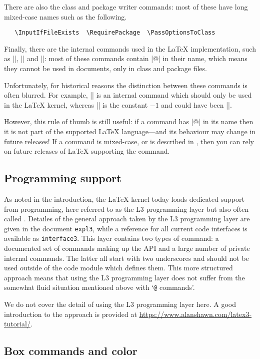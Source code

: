 \documentclass{ltxguide}
\begin{document}
There are also the class and package writer commands:
most of these have long mixed-case names such as the following.
\begin{verbatim}
   \InputIfFileExists  \RequirePackage  \PassOptionsToClass
\end{verbatim}

Finally, there are the internal commands used in the \LaTeX{}
implementation, such as |\@tempcnta|, |\@ifnextchar| and |\@eha|:
most of these commands contain |@| in their name, which means they
cannot be used in documents, only in class and package files.

Unfortunately, for historical reasons the distinction between these
commands is often blurred.  For example, |\hbox| is an internal
command which should only be used in the \LaTeX{} kernel, whereas
|\m@ne| is the constant $-1$ and could have been |\MinusOne|.

However, this rule of thumb is still useful: if a command has |@| in
its name then it is not part of the supported \LaTeX{} language---and
its behaviour may change in future releases!  If a command is
mixed-case, or is described in \emph{\LaTeXbook}, then you can rely on
future releases of \LaTeX{} supporting the command.

\subsection{Programming support}

As noted in the introduction, the \LaTeX{} kernel today loads dedicated support
from programming, here referred to as the L3 programming layer but also often
called . Detailes of the general approach taken by the L3
programming layer are given in the document \texttt{expl3}, while a reference
for all current code interfaces is available as \texttt{interface3}. This layer
contains two types of command: a documented set of commands making up the API
and a large number of private internal commands. The latter all start with two
underscores and should not be used outside of the code module which defines
them. This more structured approach means that using the L3 programming layer
does not suffer from the somewhat fluid situation mentioned above with
`\texttt{@} commands'.

We do not cover the detail of using the L3 programming layer here. A good
introduction to the approach is provided at
\url{https://www.alanshawn.com/latex3-tutorial/}.

\subsection{Box commands and color}
\label{Sec:color}
\end{document}
